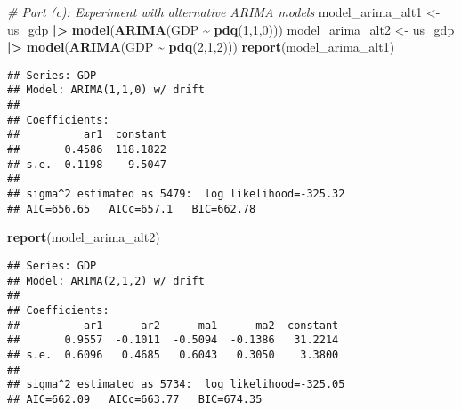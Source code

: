 \documentclass[
]{article}
\newenvironment{Shaded}{\begin{snugshade}}{\end{snugshade}}
\newcommand{\CommentTok}[1]{\textcolor[rgb]{0.56,0.35,0.01}{\textit{#1}}}
\newcommand{\DecValTok}[1]{\textcolor[rgb]{0.00,0.00,0.81}{#1}}
\newcommand{\FunctionTok}[1]{\textcolor[rgb]{0.13,0.29,0.53}{\textbf{#1}}}
\newcommand{\NormalTok}[1]{#1}
\newcommand{\OtherTok}[1]{\textcolor[rgb]{0.56,0.35,0.01}{#1}}
\newcommand{\SpecialCharTok}[1]{\textcolor[rgb]{0.81,0.36,0.00}{\textbf{#1}}}
\begin{document}
\begin{Shaded}
\begin{Highlighting}[]
\CommentTok{\# Part (c): Experiment with alternative ARIMA models}
\NormalTok{model\_arima\_alt1 }\OtherTok{\textless{}{-}}\NormalTok{ us\_gdp }\SpecialCharTok{|\textgreater{}} \FunctionTok{model}\NormalTok{(}\FunctionTok{ARIMA}\NormalTok{(GDP }\SpecialCharTok{\textasciitilde{}} \FunctionTok{pdq}\NormalTok{(}\DecValTok{1}\NormalTok{,}\DecValTok{1}\NormalTok{,}\DecValTok{0}\NormalTok{)))}
\NormalTok{model\_arima\_alt2 }\OtherTok{\textless{}{-}}\NormalTok{ us\_gdp }\SpecialCharTok{|\textgreater{}} \FunctionTok{model}\NormalTok{(}\FunctionTok{ARIMA}\NormalTok{(GDP }\SpecialCharTok{\textasciitilde{}} \FunctionTok{pdq}\NormalTok{(}\DecValTok{2}\NormalTok{,}\DecValTok{1}\NormalTok{,}\DecValTok{2}\NormalTok{)))}
\FunctionTok{report}\NormalTok{(model\_arima\_alt1)}
\end{Highlighting}
\end{Shaded}

\begin{verbatim}
## Series: GDP 
## Model: ARIMA(1,1,0) w/ drift 
## 
## Coefficients:
##          ar1  constant
##       0.4586  118.1822
## s.e.  0.1198    9.5047
## 
## sigma^2 estimated as 5479:  log likelihood=-325.32
## AIC=656.65   AICc=657.1   BIC=662.78
\end{verbatim}

\begin{Shaded}
\begin{Highlighting}[]
\FunctionTok{report}\NormalTok{(model\_arima\_alt2)}
\end{Highlighting}
\end{Shaded}

\begin{verbatim}
## Series: GDP 
## Model: ARIMA(2,1,2) w/ drift 
## 
## Coefficients:
##          ar1      ar2      ma1      ma2  constant
##       0.9557  -0.1011  -0.5094  -0.1386   31.2214
## s.e.  0.6096   0.4685   0.6043   0.3050    3.3800
## 
## sigma^2 estimated as 5734:  log likelihood=-325.05
## AIC=662.09   AICc=663.77   BIC=674.35
\end{verbatim}
\end{document}
